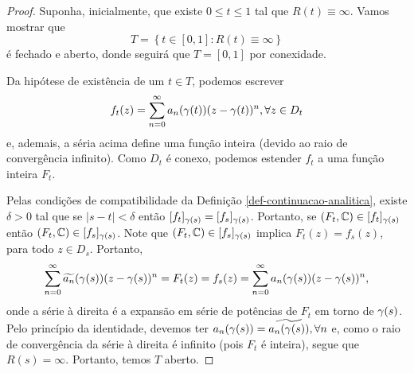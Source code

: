     \begin{proof}
        Suponha, inicialmente, que existe $0\leq t\leq 1$ tal que $R(t)\equiv\infty$.
        Vamos mostrar que
        \begin{equation*}
            T = \left\{ t\in[0,1] : R(t)\equiv\infty \right\}
        \end{equation*}
        é fechado e aberto, donde seguirá que $T = [0,1]$ por conexidade.
        
        Da hipótese de existência de um $t\in T$, podemos escrever
        \begin{equation*}
            f_t(z) = \sum_{n=0}^\infty a_n(\gamma(t))(z - \gamma(t))^n, \forall z\in D_t
        \end{equation*}
        e, ademais, a séria acima define uma função inteira (devido ao raio de convergência
        infinito). Como $D_t$ é conexo, podemos estender $f_t$ a uma função inteira $F_t$.
        
        Pelas condições de compatibilidade da Definição \ref{def-continuacao-analitica},
        existe $\delta > 0$ tal que se $|s-t|<\delta$ então 
        $[f_t]_{\gamma(s)} = [f_s]_{\gamma(s)}$. Portanto, se
        $(F_t,\mathbb{C}) \in [f_t]_{\gamma(s)}$ então $(F_t,\mathbb{C}) \in [f_s]_{\gamma(s)}$.
        Note que $(F_t,\mathbb{C}) \in [f_s]_{\gamma(s)}$ implica $F_t(z) = f_s(z)$, para todo
        $z\in D_s$. Portanto, 
        \begin{align*}
            \sum_{n=0}^\infty \widetilde{a_n}(\gamma(s))(z-\gamma(s))^n 
            =
            F_t(z)
            =
            f_s(z)
            =
            \sum_{n=0}^\infty a_n(\gamma(s))(z-\gamma(s))^n,
        \end{align*}
        onde a série à direita é a expansão em série de potências de $F_t$ em torno 
        de $\gamma(s)$. Pelo princípio da identidade, devemos ter 
        $a_n(\gamma(s)) = \widetilde{a_n(\gamma(s))}, \forall n$ e, como o raio 
        de convergência da série à direita é infinito (pois $F_t$ é inteira), segue
        que $R(s) = \infty$. Portanto, temos $T$ aberto.
        

\end{proof}
